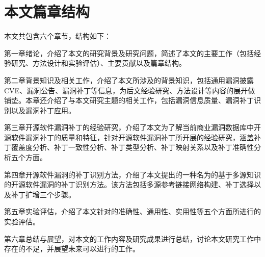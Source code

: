 \section{本文篇章结构}
本文共包含六个章节，结构如下：

第一章绪论，介绍了本文的研究背景及研究问题，简述了本文的主要工作（包括经验研究、方法设计和实验评估）、主要贡献以及篇章结构。

第二章背景知识及相关工作，介绍了本文所涉及的背景知识，包括通用漏洞披露CVE、漏洞公告、漏洞补丁等信息，为后文经验研究、方法设计等内容的展开做铺垫。本章还介绍了与本文研究主题的相关工作，包括漏洞信息质量、漏洞补丁识别以及漏洞补丁应用。

第三章开源软件漏洞补丁的经验研究，介绍了本文为了解当前商业漏洞数据库中开源软件漏洞补丁的质量和特征，针对开源软件漏洞补丁所开展的经验研究，涵盖补丁覆盖度分析、补丁一致性分析、补丁类型分析、补丁映射关系以及补丁准确性分析五个方面。

第四章开源软件漏洞的补丁识别方法，介绍了本文提出的一种名为\tool 的基于多源知识的开源软件漏洞的补丁识别方法。该方法包括多源参考链接网络构建、补丁选择以及补丁扩增三个步骤。

第五章实验评估，介绍了本文针对\tool 的准确性、通用性、实用性等五个方面所进行的实验评估。

第六章总结与展望，对本文的工作内容及研究成果进行总结，讨论本文研究工作中存在的不足，并展望未来可以进行的工作。
